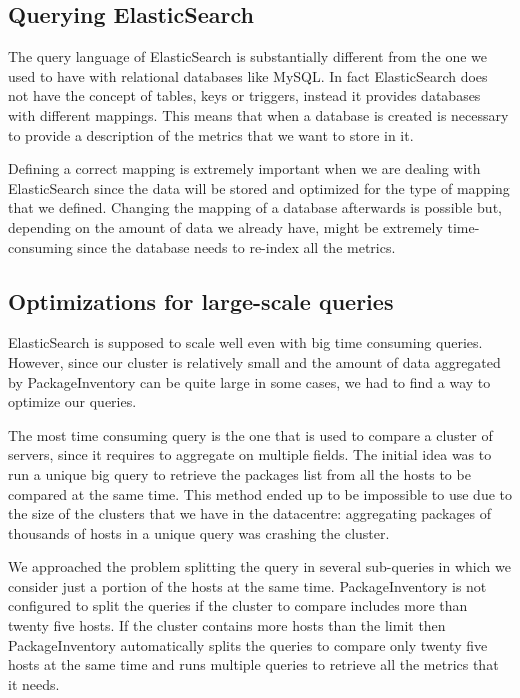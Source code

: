 \subsection{Querying ElasticSearch}

The query language of ElasticSearch is substantially different from the
one we used to have with relational databases like MySQL\@. In fact
ElasticSearch does not have the concept of tables, keys or triggers,
instead it provides databases with different mappings. This means that
when a database is created is necessary to provide a description of the
metrics that we want to store in it.

Defining a correct mapping is extremely important when we are dealing with
ElasticSearch since the data will be stored and optimized for the type of
mapping that we defined. Changing the mapping of a database afterwards is
possible but, depending on the amount of data we already have, might be
extremely time-consuming since the database needs to re-index all the
metrics.

\subsection{Optimizations for large-scale queries}

ElasticSearch is supposed to scale well even with big time consuming
queries. However, since our cluster is relatively small and the amount of
data aggregated by PackageInventory can be quite large in some cases, we
had to find a way to optimize our queries.

The most time consuming query is the one that is used to compare a cluster
of servers, since it requires to aggregate on multiple fields. The initial
idea was to run a unique big query to retrieve the packages list from all
the hosts to be compared at the same time. This method ended up to be
impossible to use due to the size of the clusters that we have in the
datacentre: aggregating packages of thousands of hosts in a unique query
was crashing the cluster.

We approached the problem splitting the query in several sub-queries in
which we consider just a portion of the hosts at the same time.
PackageInventory is not configured to split the queries if the cluster to
compare includes more than twenty five hosts. If the cluster contains more
hosts than the limit then PackageInventory automatically splits the
queries to compare only twenty five hosts at the same time and runs
multiple queries to retrieve all the metrics that it needs.
